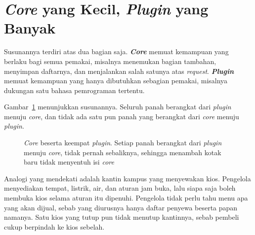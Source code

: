 \section{\textit{Core} yang Kecil, \textit{Plugin} yang Banyak}

Susunannya terdiri atas dua bagian saja. \textbf{\textit{Core}} memuat kemampuan yang
berlaku bagi semua pemakai, misalnya menemukan bagian tambahan, menyimpan
daftarnya, dan menjalankan salah satunya atas \textit{request}. \textbf{\textit{Plugin}}
memuat kemampuan yang hanya dibutuhkan sebagian pemakai, misalnya dukungan satu
bahasa pemrograman tertentu.

Gambar~\ref{fig:inti-plugin} menunjukkan susunannya. Seluruh panah berangkat
dari \textit{plugin} menuju \textit{core}, dan tidak ada satu pun panah yang berangkat
dari \textit{core} menuju \textit{plugin}.

\begin{figure}[htbp]
  \centering
  \caption{\textit{Core} beserta keempat \textit{plugin}. Setiap panah
    berangkat dari \textit{plugin} menuju \textit{core}, tidak pernah
    sebaliknya, sehingga menambah kotak baru tidak menyentuh isi
    \textit{core}}
  \label{fig:inti-plugin}
\end{figure}

Analogi yang mendekati adalah kantin kampus yang menyewakan kios. Pengelola
menyediakan tempat, listrik, air, dan aturan jam buka, lalu siapa saja boleh
membuka kios selama aturan itu dipenuhi. Pengelola tidak perlu tahu menu apa
yang akan dijual, sebab yang diurusnya hanya daftar penyewa beserta papan
namanya. Satu kios yang tutup pun tidak menutup kantinnya, sebab pembeli cukup
berpindah ke kios sebelah.


